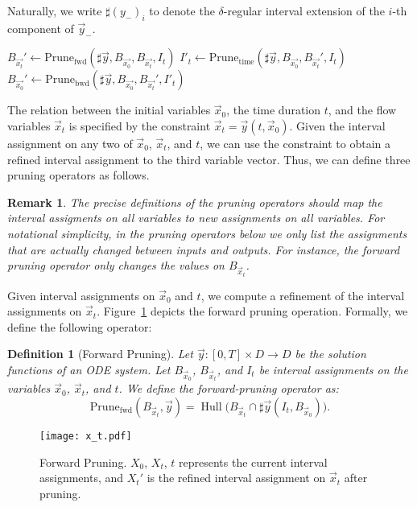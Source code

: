 \documentclass[12pt]{article}
\newtheorem{definition}[theorem]{Definition}
\newtheorem{remark}[theorem]{Remark}
\newcommand{\prunefwd}{\mathrm{Prune}_{\mathrm{fwd}}}
\newcommand{\prunebwd}{\mathrm{Prune}_{\mathrm{bwd}}}
\newcommand{\prunetime}{\mathrm{Prune}_{\mathrm{time}}}
\newcommand{\BXt}{\ensuremath{B_{\vec{x_t}}}}
\newcommand{\BXz}{\ensuremath{B_{\vec{x_0}}}}
\DeclareMathOperator{\Hull}{Hull}
\begin{document}
Naturally, we write $\sharp (y_-)_i$ to denote the $\delta$-regular interval extension of the $i$-th component of $\vec y_-$.
\begin{algorithm}\label{alg:BasicPruning}
\caption{$\mathrm{ODEPruning}(\sharp{\vec{y}}, \BXz, \BXt, I_t)$}\label{basic}
\begin{algorithmic}[1]
\Repeat
  \State $\BXt' \gets \prunefwd(\sharp{\vec{y}}, \BXz, \BXt, I_t)$
  \State ${I'_t}   \gets \prunetime(\sharp{\vec{y}}, \BXz, \BXt', I_t)$
  \State $\BXz' \gets \prunebwd(\sharp{\vec{y}}, \BXz, \BXt', I'_t)$
  \Until{$\BXz = \BXz' \land \BXt = \BXt' \land I_t= {I'_t}$}
  \State \Return{$(\BXz', \BXt', {I'_t})$}
\end{algorithmic}
\end{algorithm}


The relation between the initial variables $\vec x_0$, the time duration $t$, and the flow variables $\vec x_t$ is specified by the constraint $\vec x_t = \vec y(t, \vec x_0)$. Given the interval assignment on any two of $\vec x_0$, $\vec x_t$, and $t$, we can use the constraint to obtain a refined interval assignment to the third variable vector. Thus, we can define three pruning operators as follows.
\begin{remark}
The precise definitions of the pruning operators should map the interval assigments on all variables to new assignments on all variables. For notational simplicity, in the pruning operators below we only list the assignments that are actually changed between inputs and outputs. For instance, the forward pruning operator only changes the values on $B_{\vec x_t}$. 
\end{remark}
 Given interval assignments on $\vec x_0$ and $t$, we compute a refinement of the interval assignments on $\vec x_t$. Figure~\ref{xtp} depicts the forward pruning operation. Formally, we define the following operator:
\begin{definition}[Forward Pruning]
Let $\vec y:[0,T]\times D\rightarrow D$ be the solution functions of an ODE system. Let $B_{\vec x_0}$, $B_{\vec x_t}$, and $I_{t}$ be interval assignments on the variables $\vec x_0$, $\vec x_t$, and $t$. We define the forward-pruning operator as:
$$\mathrm{Prune}_{\mathrm{fwd}}(B_{\vec x_t}, \vec y) = \Hull\Big(B_{\vec x_t}\cap \sharp \vec y(I_t, B_{\vec x_0})\Big).$$
\end{definition}
\begin{figure}
\begin{center}
\texttt{[image: x\_t.pdf]}
\end{center}
\caption{Forward Pruning. $X_0$, $X_t$, $t$ represents the current interval assignments, and $X_t'$ is the refined interval assignment on $\vec x_t$ after pruning.}\label{xtp}
\end{figure}
\end{document}
